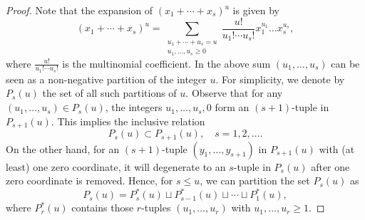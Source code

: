 \documentclass[11pt]{llncs}
\begin{document}
\begin{proof}
Note that the expansion of $(x_1+\cdots + x_s)^u$ is given by
\[
(x_1+\cdots + x_s)^u = \sum\limits_{\substack{u_1+\cdots + u_s = u\\ u_1,\dots, u_s\geq 0}} \frac{u!}{u_1!\cdots u_s!}x_1^{u_1}\dots x_s^{u_s},
\] where $ \frac{u!}{u_1!\cdots u_s!}$ is the multinomial coefficient.
In the above sum $(u_1,\dots, u_s)$ can be seen as a non-negative partition of the integer $u$. For simplicity, we denote by $P_s(u)$ the set of all such partitions of $u$.
Observe that for any $(u_1,\dots, u_s)\in P_s(u)$, the integers $u_1,\dots, u_s, 0$ form an $(s+1)$-tuple in $P_{s+1}(u)$. This implies the inclusive relation
$$
P_s(u) \subset P_{s+1}(u), \quad s = 1, 2, \dots.
$$
On the other hand, for an $(s+1)$-tuple $(y_1,\dots, y_{s+1})$ in $P_{s+1}(u)$ with (at least) one zero coordinate, it will degenerate to an $s$-tuple in $P_s(u)$ after one zero coordinate is removed.
Hence, for $s\leq u$, we can partition the set $P_{s}(u)$ as
\[
P_{s}(u) = P^*_{s}(u) \sqcup P^*_{s-1}(u) \sqcup \cdots \sqcup P^*_1(u),
\] where $P^*_{r}(u)$ contains those $r$-tuples $(u_1,\dots, u_{r})$ with $u_1,\dots, u_{r} \geq 1$.


\end{proof}
\end{document}
